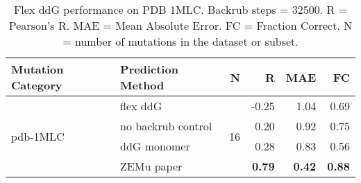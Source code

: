 \begin{table}
  \begin{tabular}{llrrrr}
\toprule
Mutation Category &   Prediction Method &   N &     R &  MAE &   FC \\
\midrule
 \multirow{ 4}{*}{pdb-1MLC} & flex ddG & \multirow{ 4}{*}{16} & -0.25 & 1.04 & 0.69  \\
 & no backrub control & & 0.20 & 0.92 & 0.75  \\
 & ddG monomer & & 0.28 & 0.83 & 0.56  \\
 & ZEMu paper & & \textbf{0.79} & \textbf{0.42} & \textbf{0.88}  \\
\bottomrule
\end{tabular}
  \caption[Flex ddG performance on PDB 1MLC]{
    Flex ddG performance on PDB 1MLC. Backrub steps = 32500. R = Pearson's R. MAE = Mean Absolute Error. FC = Fraction Correct. N = number of mutations in the dataset or subset.
  } \label{tab:table-pdb-1MLC}
\end{table}

